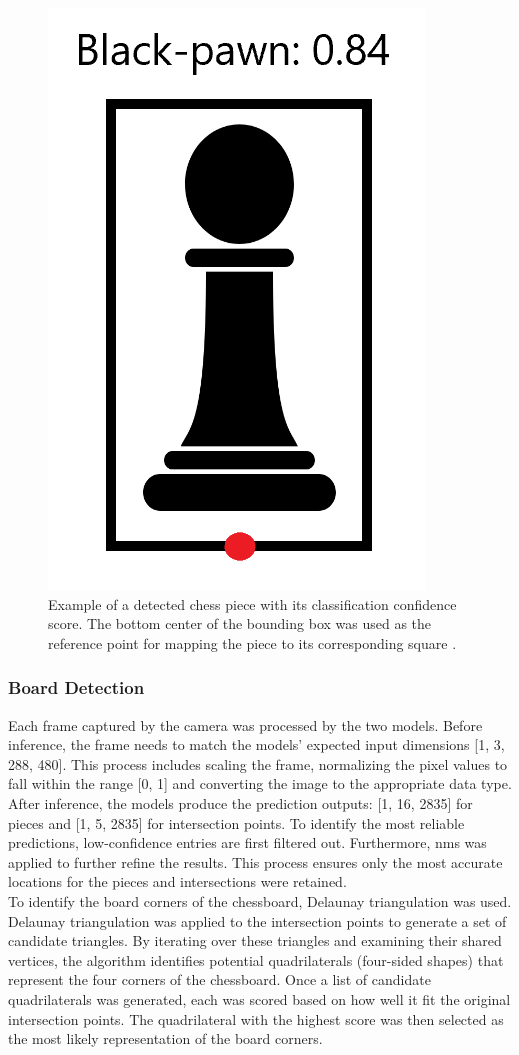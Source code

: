 

\begin{figure}[h!]
    \centering
    \includegraphics[width=0.25\linewidth]{figures/methods/ml-models/black-pawn.png}
    \caption[Detected chess piece and its bounding box]{Example of a detected chess piece with its classification confidence score. The bottom center of the bounding box was used as the reference point for mapping the piece to its corresponding square \cite{svgrepo:black-pawn-svg}.}
    \label{fig:bbox-black-pawn}
\end{figure}


\subsubsection*{Board Detection}

Each frame captured by the camera was processed by the two models. Before inference, the frame needs to match the models’ expected input dimensions [1, 3, 288, 480]. This process includes scaling the frame, normalizing the pixel values to fall within the range [0, 1] and converting the image to the appropriate data type. \\

After inference, the models produce the prediction outputs: [1, 16, 2835] for pieces and [1, 5, 2835] for intersection points. To identify the most reliable predictions, low-confidence entries are first filtered out. Furthermore, \gls{nms} was applied to further refine the results. This process ensures only the most accurate locations for the pieces and intersections were retained. \\

To identify the board corners of the chessboard, Delaunay triangulation was used. Delaunay triangulation was applied to the intersection points to generate a set of candidate triangles. By iterating over these triangles and examining their shared vertices, the algorithm identifies potential quadrilaterals (four-sided shapes) that represent the four corners of the chessboard. Once a list of candidate quadrilaterals was generated, each was scored based on how well it fit the original intersection points. The quadrilateral with the highest score was then selected as the most likely representation of the board corners.
\\

